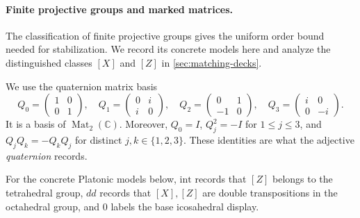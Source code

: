 \documentclass[11pt,letterpaper,onecolumn]{article}
\theoremstyle{plain}
\theoremstyle{definition}
\theoremstyle{remark}
\newcommand{\Mat}{\operatorname{Mat}}
\begin{document}
\paragraph{Finite projective groups and marked matrices.}
The classification of finite projective groups gives the uniform order
bound needed for stabilization. We record its concrete models here and
analyze the distinguished classes \([X]\) and \([Z]\) in
\cref{sec:matching-decks}.

We use the quaternion
matrix basis
\begin{equation}
  Q_0=\begin{pmatrix}1&0\\0&1\end{pmatrix},\quad
  Q_1=\begin{pmatrix}0&i\\i&0\end{pmatrix},\quad
  Q_2=\begin{pmatrix}0&1\\-1&0\end{pmatrix},\quad
  Q_3=\begin{pmatrix}i&0\\0&-i\end{pmatrix}.
  \label{eq:quaternion-basis}
\end{equation}
It is a basis of \(\Mat_2(\mathbb C)\). Moreover, \(Q_0=I\),
\(Q_j^2=-I\) for \(1\le j\le3\), and
\(Q_jQ_k=-Q_kQ_j\) for distinct \(j,k\in\{1,2,3\}\).  These identities are
what the adjective \emph{quaternion} records.

For the concrete Platonic models below, \(\mathrm{int}\) records that
\([Z]\) belongs to the tetrahedral group, \(dd\) records that \([X],[Z]\)
are double transpositions in the octahedral group, and \(0\) labels the
base icosahedral display.
\end{document}
